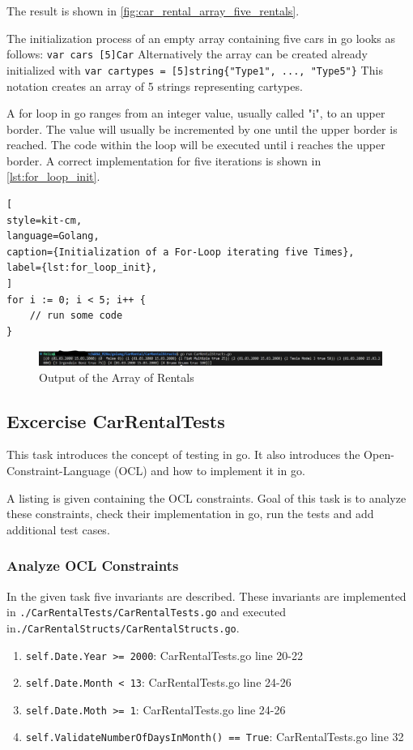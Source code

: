 The result is shown in \autoref{fig:car_rental_array_five_rentals}.

The initialization process of an empty array containing five cars in go looks as follows: \texttt{var cars [5]Car}
Alternatively the array can be created already initialized with \texttt{var cartypes = [5]string\{"Type1", ..., "Type5"\}}
This notation creates an array of 5 strings representing cartypes.

A for loop in go ranges from an integer value, usually called "i", to an upper border.
The value will usually be incremented by one until the upper border is reached. 
The code within the loop will be executed until i reaches the upper border.
A correct implementation for five iterations is shown in \autoref{lst:for_loop_init}.

\begin{lstlisting}[
style=kit-cm,
language=Golang,
caption={Initialization of a For-Loop iterating five Times},
label={lst:for_loop_init},
]
for i := 0; i < 5; i++ {
    // run some code
}
\end{lstlisting}

\begin{figure}[H]
\centering
\includegraphics[width=\textwidth]{figures/goLang/carRental/carRental_arrayFiveRentals.png}
\caption{Output of the Array of Rentals}
\label{fig:car_rental_array_five_rentals}
\end{figure}

\subsection{Excercise CarRentalTests}
\label{sec:car_rental_tests}
This task introduces the concept of testing in go.
It also introduces the Open-Constraint-Language (OCL) and how to implement it in go.

A listing is given containing the OCL constraints.
Goal of this task is to analyze these constraints, check their implementation in go, run the tests and add additional test cases.

\subsubsection*{Analyze OCL Constraints}
In the given task five invariants are described.
These invariants are implemented in \texttt{./CarRentalTests/CarRentalTests.go} and executed in\hfill \linebreak \texttt{./CarRentalStructs/CarRentalStructs.go}.
\begin{enumerate}
    \item \texttt{self.Date.Year >= 2000}: CarRentalTests.go line 20-22
    \item \texttt{self.Date.Month < 13}: CarRentalTests.go line 24-26
    \item \texttt{self.Date.Moth >= 1}: CarRentalTests.go line 24-26
    \item \texttt{self.ValidateNumberOfDaysInMonth() == True}: CarRentalTests.go line 32
\end{enumerate}

